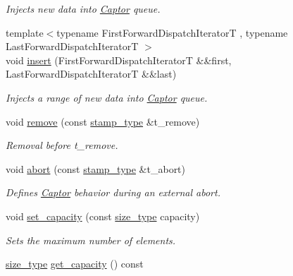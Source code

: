 \begin{DoxyCompactItemize}
\begin{DoxyCompactList}\small\item\em Injects new data into \hyperlink{classflow_1_1_captor}{Captor} queue. \end{DoxyCompactList}\item 
{\footnotesize template$<$typename First\+Forward\+Dispatch\+IteratorT , typename Last\+Forward\+Dispatch\+IteratorT $>$ }\\void \hyperlink{classflow_1_1_captor_interface_a545a4d188f6069261854c9753893fa98}{insert} (First\+Forward\+Dispatch\+IteratorT \&\&first, Last\+Forward\+Dispatch\+IteratorT \&\&last)
\begin{DoxyCompactList}\small\item\em Injects a range of new data into \hyperlink{classflow_1_1_captor}{Captor} queue. \end{DoxyCompactList}\item 
void \hyperlink{classflow_1_1_captor_interface_a492c00041af4fe2cb92342482b0b59fe}{remove} (const \hyperlink{classflow_1_1_captor_interface_a2b87d20d17e8d1437941bd98fe514bc8}{stamp\+\_\+type} \&t\+\_\+remove)
\begin{DoxyCompactList}\small\item\em Removal before {\ttfamily t\+\_\+remove}. \end{DoxyCompactList}\item 
void \hyperlink{classflow_1_1_captor_interface_a313e147c9159cf2faf7b131bac8f4b54}{abort} (const \hyperlink{classflow_1_1_captor_interface_a2b87d20d17e8d1437941bd98fe514bc8}{stamp\+\_\+type} \&t\+\_\+abort)
\begin{DoxyCompactList}\small\item\em Defines \hyperlink{classflow_1_1_captor}{Captor} behavior during an external abort. \end{DoxyCompactList}\item 
void \hyperlink{classflow_1_1_captor_interface_a8068310b1ece5c53a11252919a62355a}{set\+\_\+capacity} (const \hyperlink{classflow_1_1_captor_interface_a62db6a158eebcb377e63ede6a1f1a8c6}{size\+\_\+type} capacity)
\begin{DoxyCompactList}\small\item\em Sets the maximum number of elements. \end{DoxyCompactList}\item 
\hyperlink{classflow_1_1_captor_interface_a62db6a158eebcb377e63ede6a1f1a8c6}{size\+\_\+type} \hyperlink{classflow_1_1_captor_interface_a84ee393ca53d595bb20057445334eb78}{get\+\_\+capacity} () const

\end{DoxyCompactItemize}
